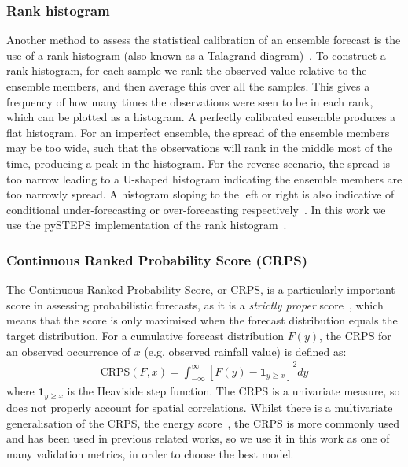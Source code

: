 \documentclass{article}
\begin{document}
\subsubsection{Rank histogram}
\label{sec:rank_hist}
Another method to assess the statistical calibration of an ensemble forecast is the use of a rank histogram (also known as a Talagrand diagram)~\citep{wilks_forecast_2019}. To construct a rank histogram, for each sample we rank the observed value relative to the ensemble members, and then average this over all the samples. This gives a frequency of how many times the observations were seen to be in each rank, which can be plotted as a histogram. A perfectly calibrated ensemble produces a flat histogram. For an imperfect ensemble, the spread of the ensemble members may be too wide, such that the observations will rank in the middle most of the time, producing a peak in the histogram. For the reverse scenario, the spread is too narrow leading to a U-shaped histogram indicating the ensemble members are too narrowly spread. A histogram sloping to the left or right is also indicative of conditional under-forecasting or over-forecasting respectively~\citep{hamill_interpretation_2001, wilks_forecast_2019}. In this work we use the pySTEPS implementation of the rank histogram~\citep{pulkkinen_pysteps_2019}.

\subsubsection{Continuous Ranked Probability Score (CRPS)}

The Continuous Ranked Probability Score, or CRPS, is a particularly important score in assessing probabilistic forecasts, as it is a \emph{strictly proper} score~\citep{wilks_statistical_2019}, which means that the score is only maximised when the forecast distribution equals the target distribution. For a cumulative forecast distribution $F(y)$, the CRPS for an observed occurrence of $x$ (e.g. observed rainfall value) is defined as:
\begin{align}
    \text{CRPS}(F, x)= \int_{-\infty}^{\infty} \left[ F(y) - \mathbf{1}_{y\geq x} \right]^2
dy\end{align}
where $\mathbf{1}_{y\geq x}$ is the Heaviside step function. The CRPS is a univariate measure, so does not properly account for spatial correlations. Whilst there is a multivariate generalisation of the CRPS, the energy score~\citep{gneiting_strictly_2007}, the CRPS is more commonly used and has been used in previous related works, so we use it in this work as one of many validation metrics, in order to choose the best model. 
\end{document}
